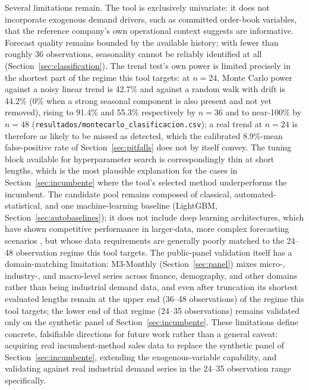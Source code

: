 \documentclass[forecasting,article,submit,pdftex,moreauthors]{Definitions/mdpi}
\begin{document}
Several limitations remain. The tool is exclusively univariate: it does not incorporate exogenous demand drivers, such as committed order-book variables, that the reference company's own operational context suggests are informative. Forecast quality remains bounded by the available history; with fewer than roughly 36 observations, seasonality cannot be reliably identified at all (Section~\ref{sec:classification}). The trend test's own power is limited precisely in the shortest part of the regime this tool targets: at $n=24$, Monte Carlo power against a noisy linear trend is 42.7\% and against a random walk with drift is 44.2\% (0\% when a strong seasonal component is also present and not yet removed), rising to 91.4\% and 55.3\% respectively by $n=36$ and to near-100\% by $n=48$ (\texttt{resultados/\allowbreak montecarlo\_\allowbreak clasificacion.csv}); a real trend at $n=24$ is therefore as likely to be missed as detected, which the calibrated 8.9\%-mean false-positive rate of Section~\ref{sec:pitfalls} does not by itself convey. The tuning block available for hyperparameter search is correspondingly thin at short lengths, which is the most plausible explanation for the cases in Section~\ref{sec:incumbente} where the tool's selected method underperforms the incumbent. The candidate pool remains composed of classical, automated-statistical, and one machine-learning baseline (LightGBM, Section~\ref{sec:autobaselines}); it does not include deep learning architectures, which have shown competitive performance in larger-data, more complex forecasting scenarios \cite{carbonneau2008}, but whose data requirements are generally poorly matched to the 24--48 observation regime this tool targets. The public-panel validation itself has a domain-matching limitation: M3-Monthly (Section~\ref{sec:panel}) mixes micro-, industry-, and macro-level series across finance, demography, and other domains rather than being industrial demand data, and even after truncation its shortest evaluated lengths remain at the upper end (36--48 observations) of the regime this tool targets; the lower end of that regime (24--35 observations) remains validated only on the synthetic panel of Section~\ref{sec:incumbente}. These limitations define concrete, falsifiable directions for future work rather than a general caveat: acquiring real incumbent-method sales data to replace the synthetic panel of Section~\ref{sec:incumbente}, extending the exogenous-variable capability, and validating against real industrial demand series in the 24--35 observation range specifically.
\end{document}
